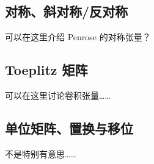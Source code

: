 \subsection{对称、斜对称/反对称}
\label{sec:symmetric}

可以在这里介绍 Penrose 的对称张量？

\subsection{Toeplitz 矩阵}
可以在这里讨论卷积张量……
\subsection{单位矩阵、置换与移位}
不是特别有意思……
